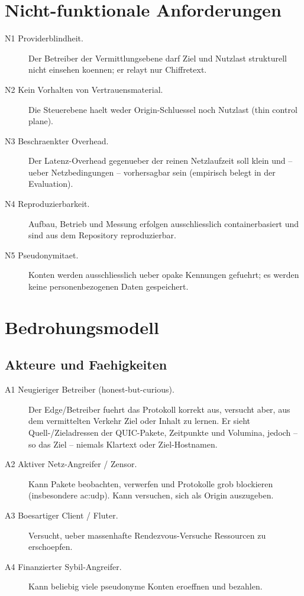 \section{Nicht-funktionale Anforderungen}
\label{sec:anf-nichtfunktional}

\begin{description}
  \item[N1 Providerblindheit.] Der Betreiber der Vermittlungsebene darf Ziel und
    Nutzlast strukturell nicht einsehen koennen; er relayt nur Chiffretext.
  \item[N2 Kein Vorhalten von Vertrauensmaterial.] Die Steuerebene haelt weder
    Origin-Schluessel noch Nutzlast (thin control plane).
  \item[N3 Beschraenkter Overhead.] Der Latenz-Overhead gegenueber der reinen
    Netzlaufzeit soll klein und -- ueber Netzbedingungen -- vorhersagbar sein
    (empirisch belegt in der Evaluation).
  \item[N4 Reproduzierbarkeit.] Aufbau, Betrieb und Messung erfolgen
    ausschliesslich containerbasiert und sind aus dem Repository reproduzierbar.
  \item[N5 Pseudonymitaet.] Konten werden ausschliesslich ueber opake Kennungen
    gefuehrt; es werden keine personenbezogenen Daten gespeichert.
\end{description}

\section{Bedrohungsmodell}
\label{sec:bedrohung}

\subsection{Akteure und Faehigkeiten}

\begin{description}
  \item[A1 Neugieriger Betreiber (honest-but-curious).] Der Edge/Betreiber
    fuehrt das Protokoll korrekt aus, versucht aber, aus dem vermittelten
    Verkehr Ziel oder Inhalt zu lernen. Er sieht Quell-/Zieladressen der
    QUIC-Pakete, Zeitpunkte und Volumina, jedoch -- so das Ziel -- niemals
    Klartext oder Ziel-Hostnamen.
  \item[A2 Aktiver Netz-Angreifer / Zensor.] Kann Pakete beobachten, verwerfen
    und Protokolle grob blockieren (insbesondere \gls{ac:udp}). Kann versuchen,
    sich als Origin auszugeben.
  \item[A3 Boesartiger Client / Fluter.] Versucht, ueber massenhafte
    Rendezvous-Versuche Ressourcen zu erschoepfen.
  \item[A4 Finanzierter Sybil-Angreifer.] Kann beliebig viele pseudonyme Konten
    eroeffnen und bezahlen.
\end{description}

